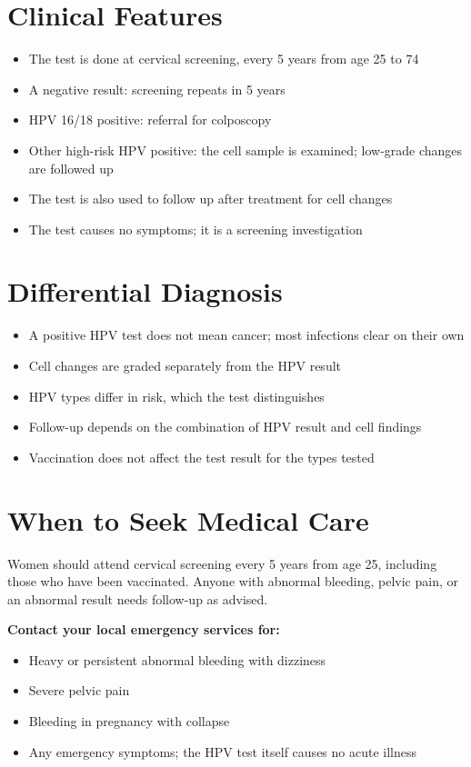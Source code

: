 \section*{Clinical Features}
\begin{itemize}
    \item The test is done at cervical screening, every 5 years from age 25 to 74
    \item A negative result: screening repeats in 5 years
    \item HPV 16/18 positive: referral for colposcopy
    \item Other high-risk HPV positive: the cell sample is examined; low-grade changes are followed up
    \item The test is also used to follow up after treatment for cell changes
    \item The test causes no symptoms; it is a screening investigation
\end{itemize}

\section*{Differential Diagnosis}
\begin{itemize}
    \item A positive HPV test does not mean cancer; most infections clear on their own
    \item Cell changes are graded separately from the HPV result
    \item HPV types differ in risk, which the test distinguishes
    \item Follow-up depends on the combination of HPV result and cell findings
    \item Vaccination does not affect the test result for the types tested
\end{itemize}

\section*{When to Seek Medical Care}
Women should attend cervical screening every 5 years from age 25, including those who have been vaccinated. Anyone with abnormal bleeding, pelvic pain, or an abnormal result needs follow-up as advised.

\textbf{Contact your local emergency services for:}
\begin{itemize}
    \item Heavy or persistent abnormal bleeding with dizziness
    \item Severe pelvic pain
    \item Bleeding in pregnancy with collapse
    \item Any emergency symptoms; the HPV test itself causes no acute illness
\end{itemize}

